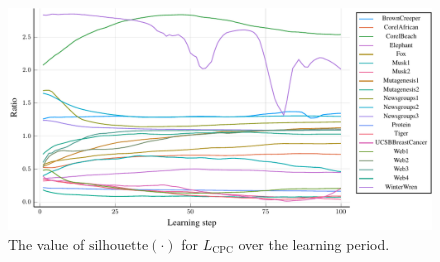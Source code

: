 \begin{figure}[h]
  \centering
  \includegraphics[width=\textwidth]{images/CPC-toy/ratio/CPC-toy-ratio.pdf}
  \caption{The value of \( \mathrm{silhouette} \left( \cdot \right) \) for \( L_\mathrm{CPC} \) over the learning period.}\label{fig:CPC-toy-ratio}
\end{figure}

